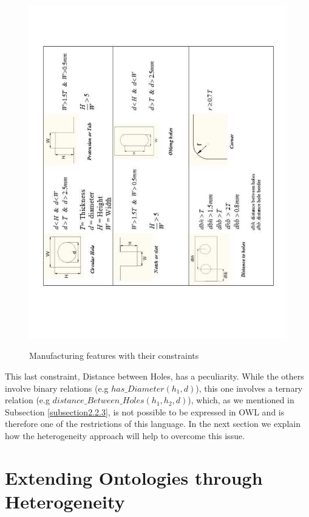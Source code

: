 \begin{figure}
\includegraphics[scale=0.5, angle=-90]{figure-chapterIV/fig4-41}\\
\caption{Manufacturing features with their constraints}
\label{figure4-41}
\end{figure}



\cbstart This last constraint, Distance between  Holes, has a peculiarity. While the others involve binary relations (e.g $has\_Diameter(h_{1},d)$), this one involves a ternary relation (e.g $distance\_Between\_Holes(h_{1},h_{2},d)$), which, as we mentioned in Subsection \ref{subsection2.2.3}, is not possible to be expressed in OWL and is therefore one of the restrictions of this language. In the next section we explain how the heterogeneity approach will help to overcome this issue. \cbend 


\section{Extending Ontologies through Heterogeneity}\label{section4.5}

